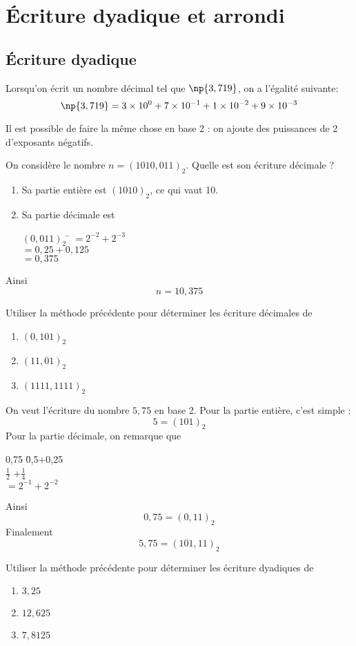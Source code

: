 \documentclass[a4paper,12pt,french]{book}
\begin{document}
\section{\'Ecriture dyadique et arrondi}

\subsection{\'Ecriture dyadique}
Lorsqu'on écrit un nombre décimal tel que $\np{3,719}$, on a l'égalité suivante:
$$\np{3,719}=3\times 10^0+7\times 10^{-1}+1\times 10^{-2}+9\times 10^{-3}$$

Il est possible de faire la même chose en base 2 : on ajoute des puissances de 2 d'exposants négatifs.

\begin{methode}
On considère le nombre $n=(1010,011)_2$. Quelle est son écriture décimale ?
\begin{enumerate}[\textbullet]
	\item 	Sa partie entière est $(1010)_2$, ce qui vaut 10.
	\item 	Sa partie décimale est
	\begin{tabbing}
	$(0,011)_2$ \= $=2^{-2}+2^{-3}$\\
				\>  $=0,25+0,125$\\
				\>	$=0,375$
	\end{tabbing}
\end{enumerate}
Ainsi $$n=10,375$$
\end{methode}
\begin{exercice}[]
	Utiliser la méthode précédente pour déterminer les écriture décimales de
	\begin{enumerate}[\bfseries 1.]
		\item 	$(0,101)_2$
		\item 	$(11,01)_2$
		\item 	$(1111,1111)_2$
	\end{enumerate}
\end{exercice}

\begin{methode}
On veut l'écriture du nombre $5,75$ en base 2. Pour la partie entière, c'est simple : $$5=(101)_2$$
Pour la partie décimale, on remarque que
\begin{tabbing}
0,75 \= 0,5+0,25\\
	\> 	$\frac{1}{2}$ +$\frac{1}{4}$\\
	\>	$=2^{-1}+2^{-2}$\\
\end{tabbing}
Ainsi $$0,75 = (0,11)_2$$
Finalement $$5,75=(101,11)_2$$
\end{methode}
\begin{exercice}[]
	Utiliser la méthode précédente pour déterminer les écriture dyadiques de
	\begin{enumerate}[\bfseries 1.]
		\item 	$3,25$
		\item 	$12,625$
		\item 	$7,8125$
	\end{enumerate}
\end{exercice}
\end{document}
